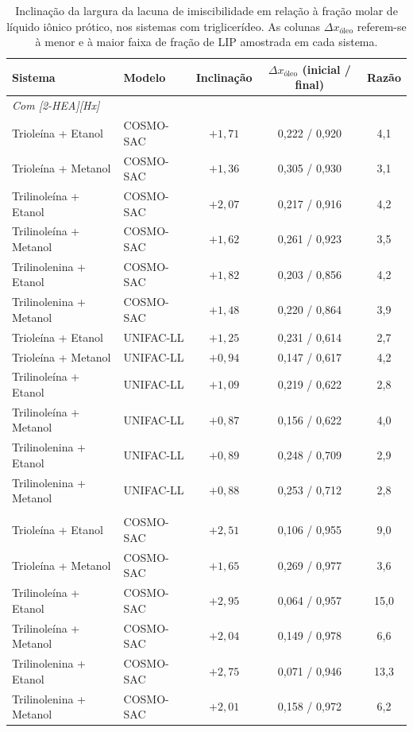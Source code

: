 \begin{table}[htb]
\centering
\caption{Inclinação da largura da lacuna de imiscibilidade em relação à fração
molar de líquido iônico prótico, nos sistemas com triglicerídeo. As colunas
$\Delta x_{\text{óleo}}$ referem-se à menor e à maior faixa de fração de LIP
amostrada em cada sistema.}
\label{tab:inclinacoes_lacuna}
\begin{tabular}{llccc}
\toprule
Sistema & Modelo & Inclinação
        & $\Delta x_{\text{óleo}}$ (inicial / final) & Razão \\
\midrule
\multicolumn{5}{l}{\textit{Com [2-HEA][Hx]}} \\
Trioleína + Etanol      & COSMO-SAC & $+1{,}71$ & 0,222 / 0,920 & 4,1 \\
Trioleína + Metanol     & COSMO-SAC & $+1{,}36$ & 0,305 / 0,930 & 3,1 \\
Trilinoleína + Etanol   & COSMO-SAC & $+2{,}07$ & 0,217 / 0,916 & 4,2 \\
Trilinoleína + Metanol  & COSMO-SAC & $+1{,}62$ & 0,261 / 0,923 & 3,5 \\
Trilinolenina + Etanol  & COSMO-SAC & $+1{,}82$ & 0,203 / 0,856 & 4,2 \\
Trilinolenina + Metanol & COSMO-SAC & $+1{,}48$ & 0,220 / 0,864 & 3,9 \\
\addlinespace
Trioleína + Etanol      & UNIFAC-LL & $+1{,}25$ & 0,231 / 0,614 & 2,7 \\
Trioleína + Metanol     & UNIFAC-LL & $+0{,}94$ & 0,147 / 0,617 & 4,2 \\
Trilinoleína + Etanol   & UNIFAC-LL & $+1{,}09$ & 0,219 / 0,622 & 2,8 \\
Trilinoleína + Metanol  & UNIFAC-LL & $+0{,}87$ & 0,156 / 0,622 & 4,0 \\
Trilinolenina + Etanol  & UNIFAC-LL & $+0{,}89$ & 0,248 / 0,709 & 2,9 \\
Trilinolenina + Metanol & UNIFAC-LL & $+0{,}88$ & 0,253 / 0,712 & 2,8 \\
\addlinespace
\multicolumn{5}{l}{\textit{Com [DETA][Hx]}} \\
Trioleína + Etanol      & COSMO-SAC & $+2{,}51$ & 0,106 / 0,955 & 9,0 \\
Trioleína + Metanol     & COSMO-SAC & $+1{,}65$ & 0,269 / 0,977 & 3,6 \\
Trilinoleína + Etanol   & COSMO-SAC & $+2{,}95$ & 0,064 / 0,957 & 15,0 \\
Trilinoleína + Metanol  & COSMO-SAC & $+2{,}04$ & 0,149 / 0,978 & 6,6 \\
Trilinolenina + Etanol  & COSMO-SAC & $+2{,}75$ & 0,071 / 0,946 & 13,3 \\
Trilinolenina + Metanol & COSMO-SAC & $+2{,}01$ & 0,158 / 0,972 & 6,2 \\
\bottomrule
\end{tabular}
\end{table}

